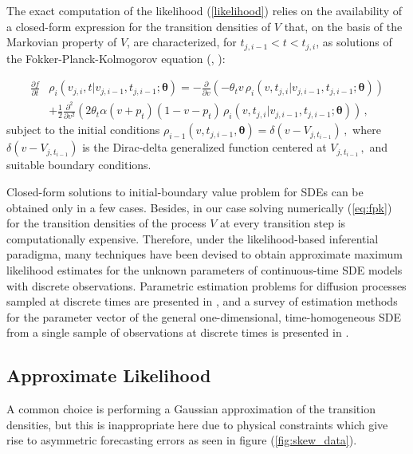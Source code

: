 \documentclass[11pt,english]{article}
\begin{document}
The exact computation of the likelihood (\ref{likelihood}) relies on the availability of a closed-form expression for the transition densities of $V$ that, on the basis of the Markovian property of $V$, are characterized, for $ t_{j, i-1} < t < t_{j,i}$,  as solutions of the Fokker-Planck-Kolmogorov equation (\cite[36]{iacus1}, \cite[61-68]{saso}):

\begin{align}
\frac{ \partial f }{\partial t } & \rho_i(v_{j,i} ,t \vert v_{j,i-1} ,  t_{j,i-1} ; \bm{\theta} )= - \frac{\partial}{ \partial v} (- \theta_t v \, \rho_i(v ,t_{j,i} \vert v_{j,i-1} ,  t_{j,i-1} ; \bm{\theta} ) ) \nonumber \\
& + \frac{1}{2} \frac{\partial^2}{ \partial v^2} ( 2 \theta_t \alpha (v+ p_t) (1 - v- p_t) \, \rho_i(v ,t_{j,i} \vert v_{j,i-1} ,  t_{j,i-1} ; \bm{\theta} ) )\,,  \label{eq:fpk}
\end{align}
subject to the initial conditions $\rho_{i-1}(v , t_{j, i-1} , \bm{\theta} ) = \delta(v - V_{j, t_{i-1}}) \,,$ where $ \delta(v - V_{j, t_{i-1}})$ is the Dirac-delta generalized function centered at $ V_{j, t_{i-1}}\,,$ and suitable boundary conditions.

Closed-form solutions to initial-boundary value problem for SDEs can be obtained only in a few cases. Besides, in our case solving numerically (\ref{eq:fpk}) for the transition densities of the process $V$ at every transition step is computationally expensive. 
Therefore, under the likelihood-based inferential paradigma, many techniques have been devised to obtain approximate maximum likelihood estimates for the unknown parameters of continuous-time SDE models with discrete observations. Parametric estimation problems for diffusion processes sampled at discrete times are presented in \autocite[Chapter 3]{iacus1}, and a survey of estimation methods for the parameter vector of the general one-dimensional, time-homogeneous SDE from a single sample of observations at discrete times is presented in \autocite{hurn}.

\subsection{Approximate Likelihood}


A common choice is performing a Gaussian approximation of the transition densities, but this is inappropriate here due to physical constraints which give rise to asymmetric forecasting errors as seen in figure (\ref{fig:skew_data}).\\
\end{document}
